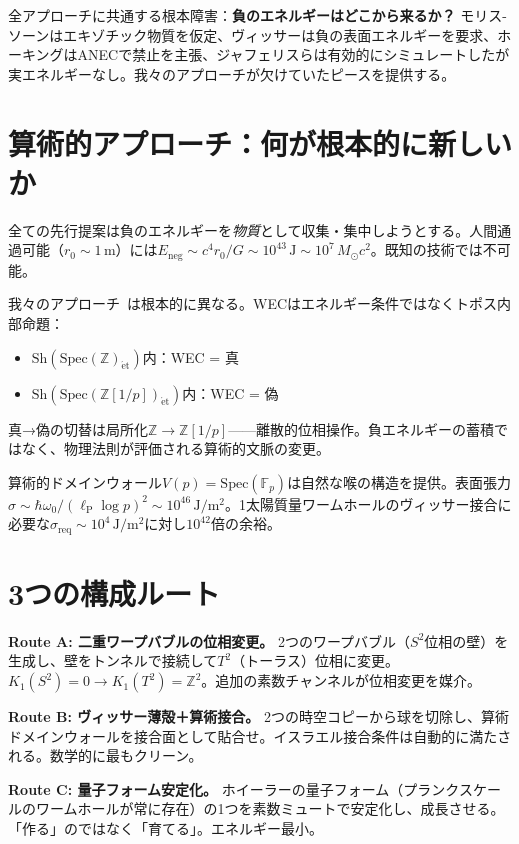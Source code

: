 \documentclass[11pt,a4paper]{article}
\newcommand{\Spec}{\mathrm{Spec}}
\newcommand{\Zp}{\mathbb{Z}[1/p]}
\newcommand{\lP}{\ell_{\mathrm{P}}}
\newcommand{\Sh}{\mathrm{Sh}}
\begin{document}
全アプローチに共通する根本障害：\textbf{負のエネルギーはどこから来るか？}
モリス-ソーンはエキゾチック物質を仮定、ヴィッサーは負の表面エネルギーを要求、ホーキングはANECで禁止を主張、ジャフェリスらは有効的にシミュレートしたが実エネルギーなし。我々のアプローチが欠けていたピースを提供する。

\section{算術的アプローチ：何が根本的に新しいか}

全ての先行提案は負のエネルギーを\emph{物質}として収集・集中しようとする。人間通過可能（$r_0 \sim 1\,\mathrm{m}$）には$E_{\mathrm{neg}} \sim c^4 r_0/G \sim 10^{43}\,\mathrm{J} \sim 10^7\,M_\odot c^2$。既知の技術では不可能。

我々のアプローチ~\cite{paper_A,paper_B}は根本的に異なる。WECはエネルギー条件ではなくトポス内部命題：
\begin{itemize}
\item $\Sh(\Spec(\mathbb{Z})_{\mathrm{\acute{e}t}})$内：WEC = 真
\item $\Sh(\Spec(\Zp)_{\mathrm{\acute{e}t}})$内：WEC = 偽
\end{itemize}

真→偽の切替は局所化$\mathbb{Z} \to \Zp$——離散的位相操作。負エネルギーの蓄積ではなく、物理法則が評価される算術的文脈の変更。

算術的ドメインウォール$V(p) = \Spec(\mathbb{F}_p)$は自然な喉の構造を提供。表面張力$\sigma \sim \hbar\omega_0/(\lP\log p)^2 \sim 10^{46}\,\mathrm{J/m^2}$。1太陽質量ワームホールのヴィッサー接合に必要な$\sigma_{\mathrm{req}} \sim 10^4\,\mathrm{J/m^2}$に対し$10^{42}$倍の余裕。

\section{3つの構成ルート}

\textbf{Route A: 二重ワープバブルの位相変更。} 2つのワープバブル（$S^2$位相の壁）を生成し、壁をトンネルで接続して$T^2$（トーラス）位相に変更。$K_1(S^2) = 0 \to K_1(T^2) = \mathbb{Z}^2$。追加の素数チャンネルが位相変更を媒介。

\textbf{Route B: ヴィッサー薄殻＋算術接合。} 2つの時空コピーから球を切除し、算術ドメインウォールを接合面として貼合せ。イスラエル接合条件は自動的に満たされる。数学的に最もクリーン。

\textbf{Route C: 量子フォーム安定化。} ホイーラーの量子フォーム（プランクスケールのワームホールが常に存在）の1つを素数ミュートで安定化し、成長させる。「作る」のではなく「育てる」。エネルギー最小。
\end{document}
